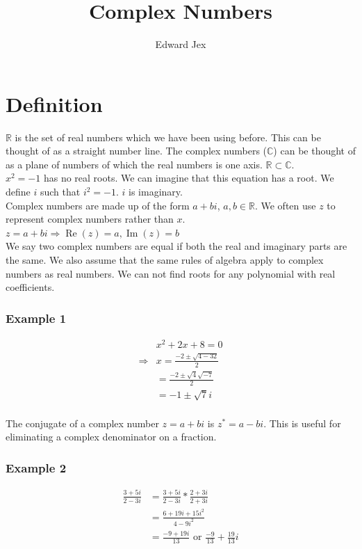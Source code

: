 \documentclass[a4paper,12pt]{article}
\begin{document}
\title{Complex Numbers}	
\author{Edward Jex}
\maketitle
\section*{Definition}
$\mathbb{R}$ is the set of real numbers which we have been using before. This can be thought of as a straight number line. The complex numbers ($\mathbb{C}$) can be thought of as a plane of numbers of which the real numbers is one axis. $\mathbb{R} \subset \mathbb{C}$. \\

$x^2 = -1$ has no real roots. We can imagine that this equation has a root. We define $i$ such that $i^2 = -1$. $i$ is imaginary. \\

Complex numbers are made up of the form $a+bi$, $a,b \in \mathbb{R}$. We often use $z$ to represent complex numbers rather than $x$. \\

$z = a+bi \Rightarrow \operatorname{Re}(z)=a, \operatorname{Im}(z)=b$ \\

We say two complex numbers are equal if both the real and imaginary parts are the same. We also assume that the same rules of algebra apply to complex numbers as real numbers. We can not find roots for any polynomial with real coefficients. 

\subsubsection*{Example 1}
\begin{align*}
& x^2 + 2x + 8 = 0 \\
\Rightarrow & x = \frac{-2 \pm \sqrt{4-32}}{2} \\
& = \frac{-2 \pm \sqrt{4} \sqrt{-7}}{2} \\
& = -1 \pm \sqrt{7}i \\
\end{align*}

The conjugate of a complex number $z = a+bi$ is $z^* = a-bi$. This is useful for eliminating a complex denominator on a fraction. 
\subsubsection*{Example 2}
\begin{align*}
\frac{3 + 5i}{2-3i} & = \frac{3 + 5i}{2-3i} * \frac{2+3i}{2+3i} \\
& = \frac{6 + 19i + 15i^2}{4-9i^2} \\
& = \frac{-9 + 19i}{13} \text{ or } \frac{-9}{13} + \frac{19}{13}i \\
\end{align*}
\end{document}
